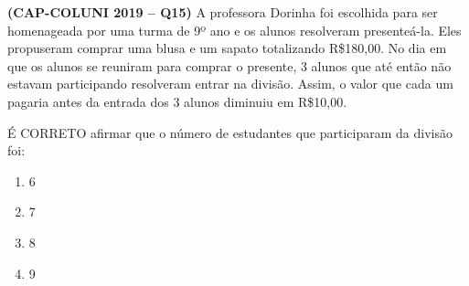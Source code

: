 \textbf{(CAP-COLUNI 2019 -- Q15)} A professora Dorinha foi escolhida para ser homenageada por uma turma de 9º ano e os alunos resolveram presenteá-la. Eles propuseram comprar uma blusa e um sapato totalizando R\$180,00. No dia em que os alunos se reuniram para comprar o presente, 3 alunos que até então não estavam participando resolveram entrar na divisão. Assim, o valor que cada um pagaria antes da entrada dos 3 alunos diminuiu em R\$10,00.

É CORRETO afirmar que o número de estudantes que participaram da divisão foi:

\begin{enumerate}
	\item 6
	\item 7
	\item 8
	\item 9
\end{enumerate}
